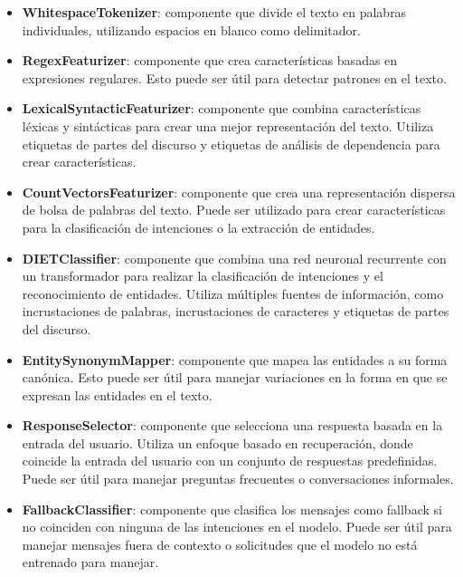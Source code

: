 \begin{itemize}
	\item \textbf{WhitespaceTokenizer}: componente que divide el texto en palabras
	      individuales, utilizando espacios en blanco como delimitador.
	      \cite{Configuation_Documentation}
	\item \textbf{RegexFeaturizer}: componente que crea características basadas en expresiones
	      regulares. Esto puede ser útil para detectar patrones en el texto.
	      \cite{Configuration_Documentation}
	\item \textbf{LexicalSyntacticFeaturizer}: componente que combina características léxicas y
	      sintácticas para crear una mejor representación del texto. Utiliza etiquetas de
	      partes del discurso
	      y etiquetas de análisis de dependencia para crear características.
	      \cite{Configuration_Documentation}
	\item \textbf{CountVectorsFeaturizer}: componente que crea una representación dispersa de
	      bolsa de
	      palabras del texto. Puede ser utilizado para crear características para la
	      clasificación de
	      intenciones o la extracción de entidades. \cite{Configuration_Documentation}
	\item \textbf{DIETClassifier}: componente que combina una red neuronal recurrente con un
	      transformador para realizar la clasificación de intenciones y el reconocimiento de
	      entidades.
	      Utiliza múltiples fuentes de información, como incrustaciones de palabras,
	      incrustaciones de
	      caracteres y etiquetas de partes del discurso. \cite{Configuration_Documentation}
	\item \textbf{EntitySynonymMapper}: componente que mapea las entidades a su forma canónica.
	      Esto
	      puede ser útil para manejar variaciones en la forma en que se expresan las entidades
	      en el texto. \cite{Configuration_Documentation}
	\item \textbf{ResponseSelector}: componente que selecciona una respuesta basada en la
	      entrada del
	      usuario. Utiliza un enfoque basado en recuperación, donde coincide la entrada del
	      usuario con un
	      conjunto de respuestas predefinidas. Puede ser útil para manejar preguntas frecuentes
	      o
	      conversaciones informales.\cite{Configuration_Documentation}
	\item \textbf{FallbackClassifier}: componente que clasifica los mensajes como fallback si
	      no
	      coinciden con ninguna de las intenciones en el modelo. Puede ser útil para manejar
	      mensajes fuera
	      de contexto o solicitudes que el modelo no está entrenado para
	      manejar.\cite{Configuration_Documentation}
\end{itemize}
